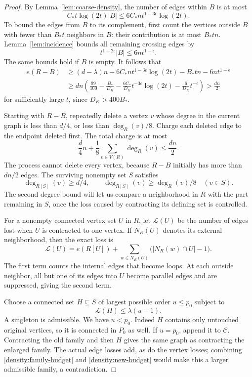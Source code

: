 \begin{proof}
By Lemma~\ref{lem:coarse-density}, the number of edges within \(B\) is
at most
\[
 C_*t\log(2t)|B|
 \le6C_*nt^{1-3\epsilon}\log(2t).
\]
To bound the edges from \(B\) to its complement, first count the
vertices outside \(B\) with fewer than \(B_*t\) neighbors in \(B\):
their contribution is at most \(B_*tn\).
Lemma~\ref{lem:incidence} bounds all remaining crossing edges by
\[
 t^{1+2\epsilon}|B|\le6nt^{1-\epsilon}.
\]
The same bounds hold if \(B\) is empty. It follows that
\[
 \begin{aligned}
 e(R-B)
 &\ge (d-\lambda)n
       -6C_*nt^{1-3\epsilon}\log(2t)
       -B_*tn-6nt^{1-\epsilon}\\
 &\ge dn\left(
 \frac{99}{100}-\frac{B_*}{D_K}
 -\frac{6C_*}{D_K}t^{-3\epsilon}\log(2t)
 -\frac6{D_K}t^{-\epsilon}\right)
 >\frac{dn}{2}
 \end{aligned}
\]
for sufficiently large \(t\), since \(D_K>400B_*\).

Starting with \(R-B\), repeatedly delete a vertex \(v\) whose degree
in the current graph is less than \(d/4\), or less than
\(\deg_R(v)/8\). Charge each deleted edge to the endpoint deleted first.
The total charge is at most
\[
 \frac d4n+\frac18\sum_{v\in V(R)}\deg_R(v)
 \le\frac{dn}{2}.
\]
The process cannot delete every vertex, because \(R-B\) initially
has more than \(dn/2\) edges. The surviving nonempty set \(S\) satisfies
\begin{equation}\label{density:surviving-degrees}
 \deg_{R[S]}(v)\ge d/4,
 \qquad
 \deg_{R[S]}(v)\ge\deg_R(v)/8
 \quad(v\in S).
\end{equation}
The second degree bound will let us compare a neighborhood in \(R\)
with the part remaining in \(S\), once the loss caused by contracting
its defining set is controlled.

For a nonempty connected vertex set \(U\) in \(R\), let
\(\mathcal L(U)\) be the number of edges lost when \(U\) is contracted
to one vertex. If \(N_R(U)\) denotes its external neighborhood, then
the exact loss is
\begin{equation}\label{density:loss-identity}
 \mathcal L(U)
 =e(R[U])+
 \sum_{w\in N_R(U)}\bigl(|N_R(w)\cap U|-1\bigr).
\end{equation}
The first term counts the internal edges that become loops.
At each outside neighbor, all but one of its edges into \(U\)
become parallel edges and are suppressed, giving the second term.

Choose a connected set \(H\subseteq S\) of largest possible order
\(u\le p_0\) subject to
\begin{equation}\label{density:new-budget}
 \mathcal L(H)\le\lambda(u-1).
\end{equation}
A singleton is admissible. We have \(u<p_0\).
Indeed \(H\) contains only untouched original vertices, so it is
connected in \(P_0\) as well. If \(u=p_0\), append it to
\(\mathcal C\). Contracting the old family and then \(H\) gives
the same graph as contracting the enlarged family.
The actual edge losses add, as do the vertex losses; combining
\eqref{density:family-budget} and \eqref{density:new-budget}
would make this a larger admissible family, a contradiction.


\end{proof}
